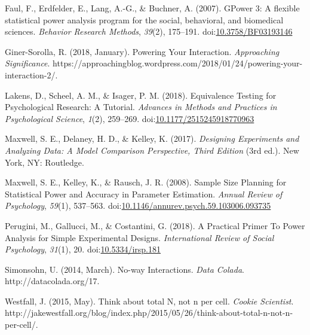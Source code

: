 \documentclass[,jou,floatsintext]{apa6}
\begin{document}
\leavevmode\hypertarget{ref-faul_gpower_2007}{}%
Faul, F., Erdfelder, E., Lang, A.-G., \& Buchner, A. (2007). GPower 3: A flexible statistical power analysis program for the social, behavioral, and biomedical sciences. \emph{Behavior Research Methods}, \emph{39}(2), 175--191. doi:\href{https://doi.org/10.3758/BF03193146}{10.3758/BF03193146}

\leavevmode\hypertarget{ref-giner-sorolla_powering_2018}{}%
Giner-Sorolla, R. (2018, January). Powering Your Interaction. \emph{Approaching Significance}. https://approachingblog.wordpress.com/2018/01/24/powering-your-interaction-2/.

\leavevmode\hypertarget{ref-lakens_equivalence_2018}{}%
Lakens, D., Scheel, A. M., \& Isager, P. M. (2018). Equivalence Testing for Psychological Research: A Tutorial. \emph{Advances in Methods and Practices in Psychological Science}, \emph{1}(2), 259--269. doi:\href{https://doi.org/10.1177/2515245918770963}{10.1177/2515245918770963}

\leavevmode\hypertarget{ref-maxwell_designing_2017}{}%
Maxwell, S. E., Delaney, H. D., \& Kelley, K. (2017). \emph{Designing Experiments and Analyzing Data: A Model Comparison Perspective, Third Edition} (3rd ed.). New York, NY: Routledge.

\leavevmode\hypertarget{ref-maxwell_sample_2008}{}%
Maxwell, S. E., Kelley, K., \& Rausch, J. R. (2008). Sample Size Planning for Statistical Power and Accuracy in Parameter Estimation. \emph{Annual Review of Psychology}, \emph{59}(1), 537--563. doi:\href{https://doi.org/10.1146/annurev.psych.59.103006.093735}{10.1146/annurev.psych.59.103006.093735}

\leavevmode\hypertarget{ref-perugini_practical_2018}{}%
Perugini, M., Gallucci, M., \& Costantini, G. (2018). A Practical Primer To Power Analysis for Simple Experimental Designs. \emph{International Review of Social Psychology}, \emph{31}(1), 20. doi:\href{https://doi.org/10.5334/irsp.181}{10.5334/irsp.181}

\leavevmode\hypertarget{ref-simonsohn_no-way_2014}{}%
Simonsohn, U. (2014, March). No-way Interactions. \emph{Data Colada}. http://datacolada.org/17.

\leavevmode\hypertarget{ref-westfall_think_2015}{}%
Westfall, J. (2015, May). Think about total N, not n per cell. \emph{Cookie Scientist}. http://jakewestfall.org/blog/index.php/2015/05/26/think-about-total-n-not-n-per-cell/.
\end{document}
